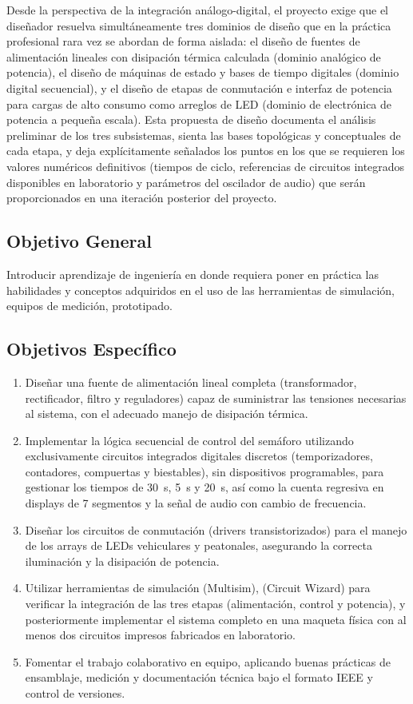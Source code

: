 \documentclass[10pt,onecolumn]{IEEEtran}
\begin{document}
Desde la perspectiva de la integración análogo-digital, el proyecto exige que el diseñador resuelva simultáneamente tres dominios de diseño que en la práctica profesional rara vez se abordan de forma aislada: el diseño de fuentes de alimentación lineales con disipación térmica calculada (dominio analógico de potencia), el diseño de máquinas de estado y bases de tiempo digitales (dominio digital secuencial), y el diseño de etapas de conmutación e interfaz de potencia para cargas de alto consumo como arreglos de LED (dominio de electrónica de potencia a pequeña escala). Esta propuesta de diseño documenta el análisis preliminar de los tres subsistemas, sienta las bases topológicas y conceptuales de cada etapa, y deja explícitamente señalados los puntos en los que se requieren los valores numéricos definitivos (tiempos de ciclo, referencias de circuitos integrados disponibles en laboratorio y parámetros del oscilador de audio) que serán proporcionados en una iteración posterior del proyecto.



\subsection{Objetivo General}
Introducir aprendizaje de ingeniería en donde requiera poner en práctica las habilidades y conceptos adquiridos en el uso de las herramientas de simulación, equipos de medición, prototipado.
\subsection{Objetivos Específico }
\begin{enumerate}
    \item Diseñar una fuente de alimentación lineal completa (transformador, rectificador, filtro y reguladores) capaz de suministrar las tensiones necesarias al sistema, con el adecuado manejo de disipación térmica.
    \item Implementar la lógica secuencial de control del semáforo utilizando exclusivamente circuitos integrados digitales discretos (temporizadores, contadores, compuertas y biestables), sin dispositivos programables, para gestionar los tiempos de 30~s, 5~s y 20~s, así como la cuenta regresiva en displays de 7 segmentos y la señal de audio con cambio de frecuencia.
    \item Diseñar los circuitos de conmutación (drivers transistorizados) para el manejo de los arrays de LEDs vehiculares y peatonales, asegurando la correcta iluminación y la disipación de potencia.
    \item Utilizar herramientas de simulación (Multisim), (Circuit Wizard) para verificar la integración de las tres etapas (alimentación, control y potencia), y posteriormente implementar el sistema completo en una maqueta física con al menos dos circuitos impresos fabricados en laboratorio.
    \item Fomentar el trabajo colaborativo en equipo, aplicando buenas prácticas de ensamblaje, medición y documentación técnica bajo el formato IEEE y control de versiones.
\end{enumerate}
\end{document}

